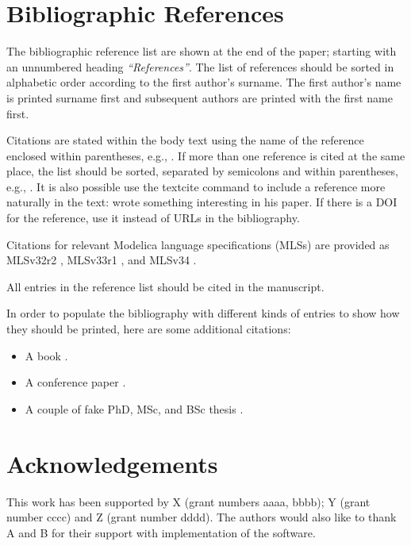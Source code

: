 \documentclass{modelica}
\begin{document}
\section{Bibliographic References}
The bibliographic reference list are shown at the end of the paper;
starting with an unnumbered heading \emph{``References''}. The list of
references should be sorted in alphabetic order according to the first
author's surname.
The first author's name is printed surname first and subsequent authors are printed with the first name first.

Citations are stated within the body text using the name of the
reference enclosed within parentheses, e.g., \cite{Pantelides:1988}. If
more than one reference is cited at the same place, the list should be
sorted, separated by semicolons and within parentheses, e.g.,
\cite{DuffReid:1978,Pierce:2002,Plotkin:1981}.
It is also possible use the textcite command to include a reference more naturally in the text: \textcite{Pantelides:1988} wrote something interesting in his paper.
If there is a DOI for the reference, use it instead of URLs in the bibliography.

Citations for relevant Modelica language specifications (MLSs) are provided as
MLSv32r2 \cite{MLSv32r2}, MLSv33r1 \cite{MLSv33r1}, and MLSv34 \cite{MLSv34}.

All entries in the reference list should be cited in the manuscript.

In order to populate the bibliography with different kinds of entries to show how they should be printed, here are some additional citations:

\begin{itemize}
\item A book \cite{Kernighan:1988}.
\item A conference paper \cite{colaco:2003}.
\item A couple of fake PhD, MSc, and BSc thesis \cite{Doe:PhD,Doe:MSc,Doe:BSc}.
\end{itemize}

\section*{Acknowledgements}

This work has been supported by X (grant numbers aaaa, bbbb); Y (grant number cccc) and Z (grant number dddd).
The authors would also like to thank A and B for their support with implementation of the software.

\printbibliography
\end{document}
